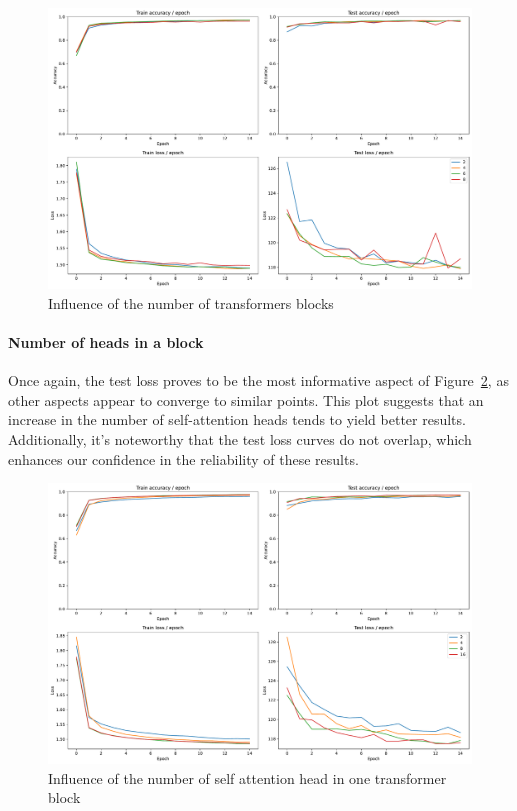 \begin{figure}[H]
    \centering
    \includegraphics*[width=\textwidth]{figs/Transformers/nb_block_influence.pdf}
    \caption{Influence of the number of transformers blocks}
    \label{fig:nb_block_influence}
\end{figure}

\paragraph{Number of heads in a block}
Once again, the test loss proves to be the most informative aspect of Figure~\ref*{fig:num_heads_influence}, as other aspects appear to converge to similar points. This plot suggests that an increase in the number of self-attention heads tends to yield better results. Additionally, it's noteworthy that the test loss curves do not overlap, which enhances our confidence in the reliability of these results.

\begin{figure}[H]
    \centering
    \includegraphics*[width=\textwidth]{figs/Transformers/num_heads_influence.pdf}
    \caption{Influence of the number of self attention head in one transformer block }
    \label{fig:num_heads_influence}
\end{figure}

